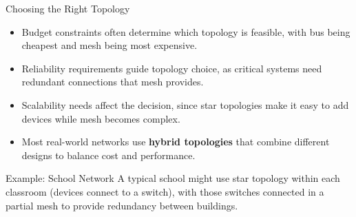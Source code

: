 \documentclass[aspectratio=169]{beamer}
\begin{document}
\begin{frame}{Choosing the Right Topology}

\begin{itemize}
    \item Budget constraints often determine which topology is feasible, with bus being cheapest and mesh being most expensive.
    \item Reliability requirements guide topology choice, as critical systems need redundant connections that mesh provides.
    \item Scalability needs affect the decision, since star topologies make it easy to add devices while mesh becomes complex.
    \item Most real-world networks use \textbf{hybrid topologies} that combine different designs to balance cost and performance.
\end{itemize}

\vspace{0.3cm}

\begin{block}{Example: School Network}
A typical school might use star topology within each classroom (devices connect to a switch), with those switches connected in a partial mesh to provide redundancy between buildings.
\end{block}

\end{frame}
\end{document}
